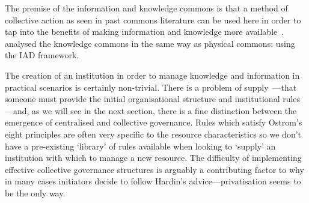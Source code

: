 
The premise of the information and knowledge commons is that a method of collective action as seen in past commons literature can be used here in order to tap into the benefits of making information and knowledge more available~\citep{Hess2007,MayoFusterMorell2010,Shadbolt2013}. \citet{Ostrom2007a} analysed the knowledge commons in the same way as physical commons: using the \ac{IAD} framework.

The creation of an institution in order to manage knowledge and information in practical scenarios is certainly non-trivial. 
There is a problem of supply~\cite[p. 42]{Ostrom1990}---that someone must provide the initial organisational structure and institutional rules---and, as we will see in the next section, there is a fine distinction between the emergence of centralised and collective governance. 
Rules which satisfy Ostrom's eight principles are often very specific to the resource characteristics so we don't have a pre-existing `library' of rules available when looking to `supply' an institution with which to manage a new resource. 
The difficulty of implementing effective collective governance structures is arguably a contributing factor to why in many cases initiators decide to follow Hardin's advice---privatisation seems to be the only way.



